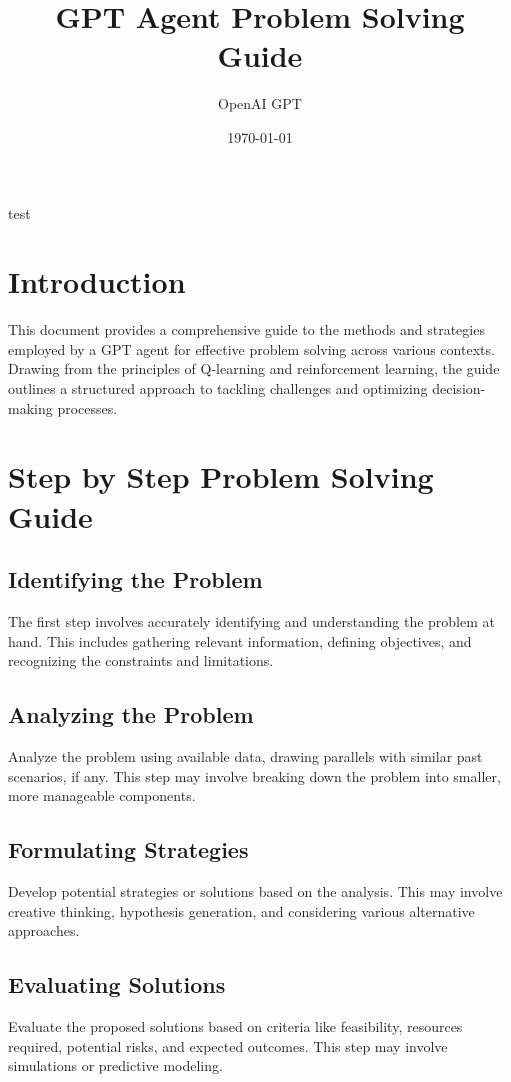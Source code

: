 \documentclass{article}
\title{GPT Agent Problem Solving Guide}
\author{OpenAI GPT}
\date{\today}
\begin{document}
test

\maketitle

\section{Introduction}
This document provides a comprehensive guide to the methods and strategies employed by a GPT agent for effective problem solving across various contexts. Drawing from the principles of Q-learning and reinforcement learning, the guide outlines a structured approach to tackling challenges and optimizing decision-making processes.

\section{Step by Step Problem Solving Guide}
\subsection{Identifying the Problem}
The first step involves accurately identifying and understanding the problem at hand. This includes gathering relevant information, defining objectives, and recognizing the constraints and limitations.

\subsection{Analyzing the Problem}
Analyze the problem using available data, drawing parallels with similar past scenarios, if any. This step may involve breaking down the problem into smaller, more manageable components.

\subsection{Formulating Strategies}
Develop potential strategies or solutions based on the analysis. This may involve creative thinking, hypothesis generation, and considering various alternative approaches.

\subsection{Evaluating Solutions}
Evaluate the proposed solutions based on criteria like feasibility, resources required, potential risks, and expected outcomes. This step may involve simulations or predictive modeling.
\end{document}
